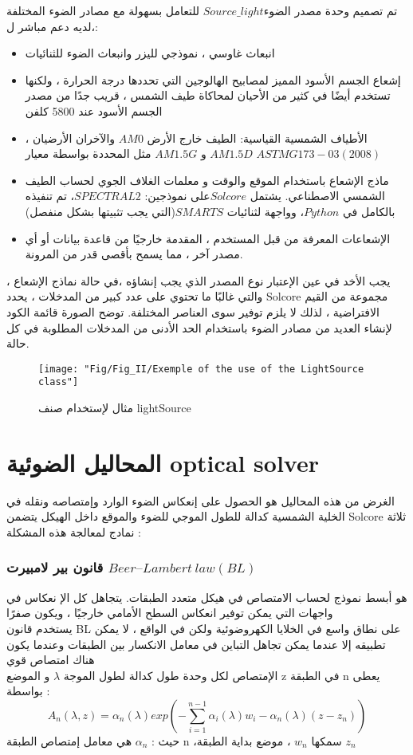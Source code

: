 تم تصميم وحدة مصدر الضوء$ Source\_light $ للتعامل بسهولة مع مصادر الضوء المختلفة ،لديه دعم مباشر ل: 
\begin{itemize}
	\item 
	انبعاث غاوسي ، نموذجي لليزر وانبعاث الضوء للثنائيات 
	\item 
	إشعاع الجسم الأسود المميز لمصابيح الهالوجين التي تحددها درجة الحرارة ، ولكنها تستخدم أيضًا في كثير من الأحيان لمحاكاة طيف الشمس ، قريب جدًا من مصدر الجسم  الأسود عند 5800 كلفن
	\item 
	الأطياف الشمسية القياسية: الطيف خارج الأرض $ AM0 $ والآخران الأرضيان ، $ AM1.5D $ و $ AM1.5G $ مثل المحددة بواسطة معيار $ ASTM G173-03 (2008) $ 
	\item 
	ماذج الإشعاع باستخدام الموقع والوقت و معلمات الغلاف الجوي لحساب الطيف الشمسي الاصطناعي. يشتمل $ Solcore  $على نموذجين: $ SPECTRAL2  $، تم تنفيذه بالكامل في $ Python  $، وواجهة لثنائيات $ SMARTS  $(التي يجب تثبيتها بشكل منفصل)
	\item 
	الإشعاعات المعرفة من قبل المستخدم ، المقدمة خارجيًا من قاعدة بيانات أو أي مصدر آخر ، مما يسمح بأقصى قدر من المرونة.
\end{itemize}
يجب الأخد في عين الإعتبار نوع المصدر الذي يجب إنشاؤه  ،في حالة نماذج الإشعاع ، والتي غالبًا ما تحتوي على عدد كبير من المدخلات ، يحدد Solcore مجموعة من القيم الافتراضية ، لذلك لا يلزم توفير سوى العناصر المختلفة. توضح الصورة قائمة الكود  لإنشاء العديد من مصادر الضوء باستخدام الحد الأدنى من المدخلات المطلوبة في كل حالة.  
\begin{figure}[h!]
	\centering
	\texttt{[image: "Fig/Fig\_II/Exemple of the use of the LightSource class"]}
	\caption{مثال لإستخدام صنف lightSource}
	\label{fig:exemple-of-the-use-of-the-lightsource-class}
\end{figure}
\FloatBarrier
\section{    المحاليل الضوئية optical solver }
الغرض من هذه المحاليل هو الحصول على إنعكاس الضوء الوارد وإمتصاصه ونقله في الخلية الشمسية كدالة للطول الموجي للضوء والموقع داخل الهيكل 
يتضمن Solcore ثلاثة نمادج لمعالجة هذه المشكلة : 
\subsubsection{قانون بير لامبيرت $ Beer–Lambert ~law (BL) $}

هو أبسط نموذج لحساب الامتصاص في هيكل متعدد الطبقات. يتجاهل كل الإ نعكاس في واجهات التي يمكن توفير انعكاس السطح الأمامي خارجيًا ، ويكون صفرًا  \\
يستخدم قانون BL على نطاق واسع في الخلايا الكهروضوئية ولكن في الواقع ، لا يمكن تطبيقه إلا عندما يمكن تجاهل التباين في معامل الانكسار بين الطبقات وعندما يكون هناك امتصاص قوي \\
الإمتصاص لكل وحدة طول كدالة لطول الموجة  $\lambda$ و الموضع z في الطبقة n يعطى بواسطة :\\
\begin{equation}
	A_n(\lambda,z)=\alpha_n(\lambda)exp(-\sum_{i=1}^{ n-1}\alpha_i(\lambda)w_i-\alpha_ n ( \lambda )(z-z_n))
\end{equation}
حيث : $\alpha_n$ هي معامل إمتصاص الطبقة n  ،سمكها  $ w_n $ ، موضع بداية الطبقة $  z_n $
